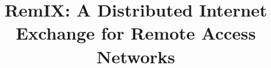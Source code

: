 \documentclass{sig-alternate-10pt}
\begin{document}






%

\title{RemIX: A Distributed Internet Exchange for Remote Access Networks
}

%
%
%
%
%
\end{document}
